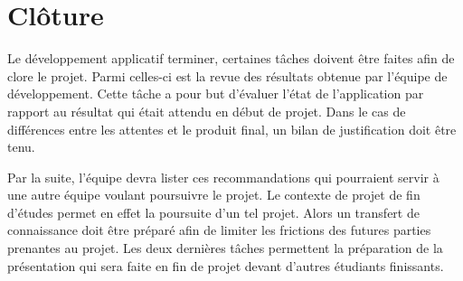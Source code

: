 \documentclass[rapport.tex]{subfiles}
\begin{document}
\section*{Clôture}
Le développement applicatif terminer, certaines tâches doivent être faites afin de clore le projet. Parmi celles-ci est la revue des résultats obtenue par l’équipe de développement. Cette tâche a pour but d’évaluer l’état de l’application par rapport au résultat qui était attendu en début de projet. Dans le cas de différences entre les attentes et le produit final, un bilan de justification doit être tenu.
\par
Par la suite, l’équipe devra lister ces recommandations qui pourraient servir à une autre équipe voulant poursuivre le projet. Le contexte de projet de fin d’études permet en effet la poursuite d’un tel projet. Alors un transfert de connaissance doit être préparé afin de limiter les frictions des futures parties prenantes au projet. Les deux dernières tâches permettent la préparation de la présentation qui sera faite en fin de projet devant d’autres étudiants finissants.
\end{document}
